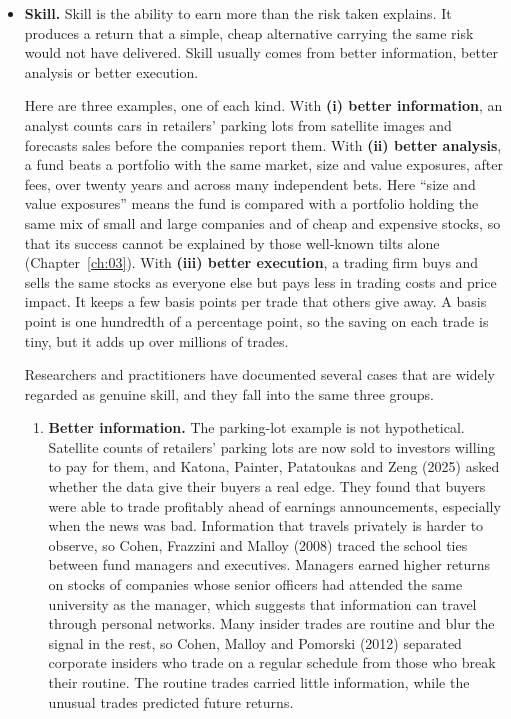 \begin{itemize}
  \item \textbf{Skill.} Skill is the ability to earn more than the risk taken
  explains. It produces a return that a simple, cheap alternative carrying the
  same risk would not have delivered. Skill usually comes from better
  information, better analysis or better execution.

  Here are three examples, one of each kind. 
  With \textbf{(i) better
  information}, an analyst counts cars in retailers' parking lots from
  satellite images and forecasts sales before the companies report them.
  With \textbf{(ii) better analysis}, a fund beats a portfolio with the same
  market, size and value exposures, after fees, over twenty years and across
  many independent bets. Here ``size and value exposures'' means the fund is
  compared with a portfolio holding the same mix of small and large companies
  and of cheap and expensive stocks, so that its success cannot be explained
  by those well-known tilts alone (Chapter~\ref{ch:03}).
  With \textbf{(iii) better execution}, a trading firm
  buys and sells the same stocks as everyone else but pays less in trading
  costs and price impact. It keeps a few basis points per trade that others
  give away. A basis point is one hundredth of a percentage point, so the
  saving on each trade is tiny, but it adds up over millions of trades.

  
  Researchers and practitioners have documented several cases that are widely
  regarded as genuine skill, and they fall into the same three groups.
  
  \begin{enumerate}
    \item \textbf{Better information.} The parking-lot example is not hypothetical.
  Satellite counts of retailers' parking lots are now sold to investors
  willing to pay for them, and Katona, Painter, Patatoukas and Zeng (2025)
  asked whether the data give their buyers a real edge. They found that
  buyers were able to trade profitably ahead of earnings announcements,
  especially when the news was bad. Information that travels privately is
  harder to observe, so Cohen, Frazzini and Malloy (2008) traced the school
  ties between fund managers and executives. Managers earned higher returns
  on stocks of companies whose senior officers had attended the same
  university as the manager, which suggests that information can travel
  through personal networks. Many insider trades are routine and blur the
  signal in the rest, so Cohen, Malloy and Pomorski (2012) separated
  corporate insiders who trade on a regular schedule from those who break
  their routine. The routine trades carried little information, while the
  unusual trades predicted future returns.


\end{enumerate}
\end{itemize}
